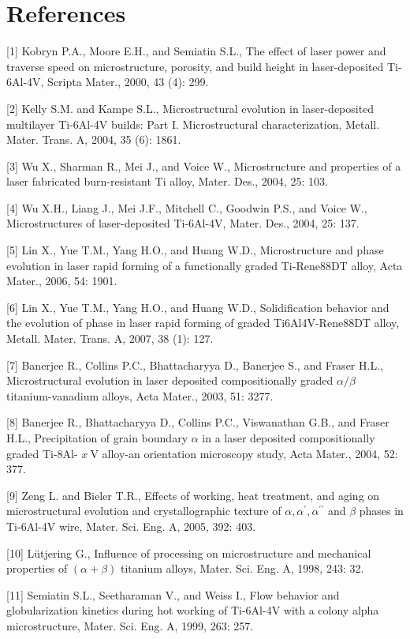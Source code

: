 \documentclass[10pt]{article}
\begin{document}
\section*{References}
[1] Kobryn P.A., Moore E.H., and Semiatin S.L., The effect of laser power and traverse speed on microstructure, porosity, and build height in laser-deposited Ti-6Al-4V, Scripta Mater., 2000, 43 (4): 299.

[2] Kelly S.M. and Kampe S.L., Microstructural evolution in laser-deposited multilayer Ti-6Al-4V builds: Part I. Microstructural characterization, Metall. Mater. Trans. A, 2004, 35 (6): 1861.

[3] Wu X., Sharman R., Mei J., and Voice W., Microstructure and properties of a laser fabricated burn-resistant Ti alloy, Mater. Des., 2004, 25: 103.

[4] Wu X.H., Liang J., Mei J.F., Mitchell C., Goodwin P.S., and Voice W., Microstructures of laser-deposited Ti-6Al-4V, Mater. Des., 2004, 25: 137.

[5] Lin X., Yue T.M., Yang H.O., and Huang W.D., Microstructure and phase evolution in laser rapid forming of a functionally graded Ti-Rene88DT alloy, Acta Mater., 2006, 54: 1901.

[6] Lin X., Yue T.M., Yang H.O., and Huang W.D., Solidification behavior and the evolution of phase in laser rapid forming of graded Ti6Al4V-Rene88DT alloy, Metall. Mater. Trans. A, 2007, 38 (1): 127.

[7] Banerjee R., Collins P.C., Bhattacharyya D., Banerjee S., and Fraser H.L., Microstructural evolution in laser deposited compositionally graded $\alpha / \beta$ titanium-vanadium alloys, Acta Mater., 2003, 51: 3277.

[8] Banerjee R., Bhattacharyya D., Collins P.C., Viswanathan G.B., and Fraser H.L., Precipitation of grain boundary $\alpha$ in a laser deposited compositionally graded Ti-8Al- $x \mathrm{~V}$ alloy-an orientation microscopy study, Acta Mater., 2004, 52: 377.

[9] Zeng L. and Bieler T.R., Effects of working, heat treatment, and aging on microstructural evolution and crystallographic texture of $\alpha, \alpha^{\prime}, \alpha^{\prime \prime}$ and $\beta$ phases in Ti-6Al-4V wire, Mater. Sci. Eng. A, 2005, 392: 403.

[10] Lütjering G., Influence of processing on microstructure and mechanical properties of $(\alpha+\beta)$ titanium alloys, Mater. Sci. Eng. A, 1998, 243: 32.

[11] Semiatin S.L., Seetharaman V., and Weiss I., Flow behavior and globularization kinetics during hot working of Ti-6Al-4V with a colony alpha microstructure, Mater. Sci. Eng. A, 1999, 263: 257.
\end{document}
